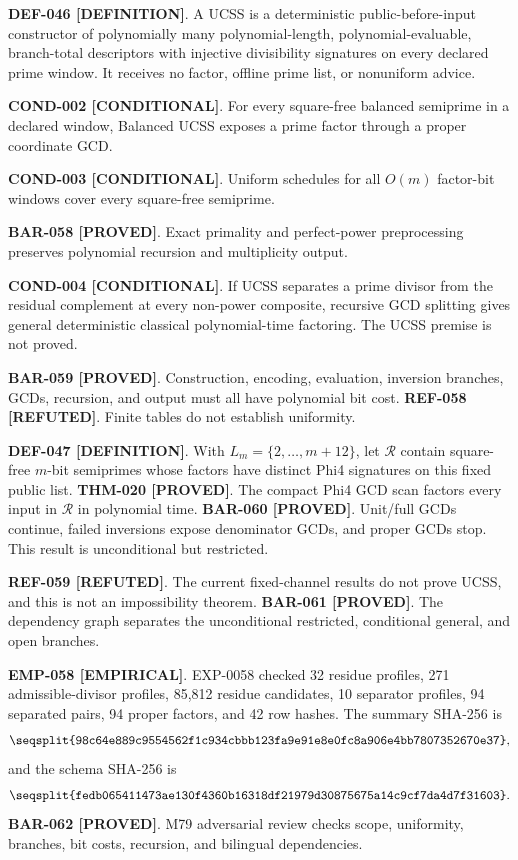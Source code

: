 \documentclass[11pt]{article}
\newcommand{\claimstatus}[2]{\textbf{#1 [#2]}}
\begin{document}
\claimstatus{DEF-046}{DEFINITION}. A UCSS is a deterministic
public-before-input constructor of polynomially many polynomial-length,
polynomial-evaluable, branch-total descriptors with injective divisibility
signatures on every declared prime window. It receives no factor, offline
prime list, or nonuniform advice.

\claimstatus{COND-002}{CONDITIONAL}. For every square-free balanced
semiprime in a declared window, Balanced UCSS exposes a prime factor through
a proper coordinate GCD.

\claimstatus{COND-003}{CONDITIONAL}. Uniform schedules for all \(O(m)\)
factor-bit windows cover every square-free semiprime.

\claimstatus{BAR-058}{PROVED}. Exact primality and perfect-power
preprocessing preserves polynomial recursion and multiplicity output.

\claimstatus{COND-004}{CONDITIONAL}. If UCSS separates a prime divisor from
the residual complement at every non-power composite, recursive GCD
splitting gives general deterministic classical polynomial-time factoring.
The UCSS premise is not proved.

\claimstatus{BAR-059}{PROVED}. Construction, encoding, evaluation,
inversion branches, GCDs, recursion, and output must all have polynomial bit
cost.
\claimstatus{REF-058}{REFUTED}. Finite tables do not establish uniformity.

\claimstatus{DEF-047}{DEFINITION}. With
\(L_m=\{2,\ldots,m+12\}\), let \(\mathcal R\) contain square-free
\(m\)-bit semiprimes whose factors have distinct Phi4 signatures on this
fixed public list.
\claimstatus{THM-020}{PROVED}. The compact Phi4 GCD scan factors every input
in \(\mathcal R\) in polynomial time.
\claimstatus{BAR-060}{PROVED}. Unit/full GCDs continue, failed inversions
expose denominator GCDs, and proper GCDs stop. This result is unconditional
but restricted.

\claimstatus{REF-059}{REFUTED}. The current fixed-channel results do not
prove UCSS, and this is not an impossibility theorem.
\claimstatus{BAR-061}{PROVED}. The dependency graph separates the
unconditional restricted, conditional general, and open branches.

\claimstatus{EMP-058}{EMPIRICAL}. EXP-0058 checked 32 residue profiles,
271 admissible-divisor profiles, 85,812 residue candidates, 10 separator
profiles, 94 separated pairs, 94 proper factors, and 42 row hashes. The
summary SHA-256 is
\[
\texttt{\seqsplit{98c64e889c9554562f1c934cbbb123fa9e91e8e0fc8a906e4bb7807352670e37}},
\]
and the schema SHA-256 is
\[
\texttt{\seqsplit{fedb065411473ae130f4360b16318df21979d30875675a14c9cf7da4d7f31603}}.
\]
\claimstatus{BAR-062}{PROVED}. M79 adversarial review checks scope,
uniformity, branches, bit costs, recursion, and bilingual dependencies.
\end{document}
